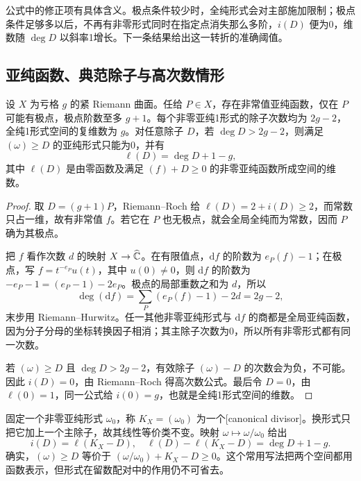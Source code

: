 公式中的修正项有具体含义。极点条件较少时，全纯形式会对主部施加限制；极点条件足够多以后，不再有非零形式同时在指定点消失那么多阶，\(i(D)\) 便为0，维数随 \(\deg D\) 以斜率1增长。下一条结果给出这一转折的准确阈值。

\subsection{亚纯函数、典范除子与高次数情形}
\label{b3:subsec:A0602}

\begin{proposition}[函数存在与典范次数]\label{b3:prop:A-riemann-roch-consequences}
设 \(X\) 为亏格 \(g\) 的紧 Riemann 曲面。任给 \(P\in X\)，存在非常值亚纯函数，仅在 \(P\) 可能有极点，极点阶数至多 \(g+1\)。每个非零亚纯1形式的除子次数均为 \(2g-2\)，全纯1形式空间的复维数为 \(g\)。对任意除子 \(D\)，若 \(\deg D>2g-2\)，则满足 \((\omega)\ge D\) 的亚纯形式只能为0，并有
\[
 \ell(D)=\deg D+1-g,
\]
其中 \(\ell(D)\) 是由零函数及满足 \((f)+D\ge0\) 的非零亚纯函数所成空间的维数。
\end{proposition}
\begin{proof}
取 \(D=(g+1)P\)，Riemann--Roch 给 \(\ell(D)=2+i(D)\ge2\)，而常数只占一维，故有非常值 \(f\)。若它在 \(P\) 也无极点，就会全局全纯而为常数，因而 \(P\) 确为其极点。

把 \(f\) 看作次数 \(d\) 的映射 \(X\rightarrow\widehat{\mathbb C\kern0pt}\)。在有限值点，\(\mathrm{d}f\) 的阶数为 \(e_P(f)-1\)；在极点，写 \(f=t^{-e_P}u(t)\)，其中 \(u(0)\ne0\)，则 \(\mathrm{d}f\) 的阶数为 \(-e_P-1=(e_P-1)-2e_P\)。极点的局部重数之和为 \(d\)，所以
\[
 \deg(\mathrm{d}f)=\sum_P(e_P(f)-1)-2d=2g-2,
\]
末步用 Riemann--Hurwitz。任一其他非零亚纯形式与 \(\mathrm{d}f\) 的商都是全局亚纯函数，因为分子分母的坐标转换因子相消；其主除子次数为0，所以所有非零形式都有同一次数。

若 \((\omega)\ge D\) 且 \(\deg D>2g-2\)，有效除子 \((\omega)-D\) 的次数会为负，不可能。因此 \(i(D)=0\)，由 Riemann--Roch 得高次数公式。最后令 \(D=0\)，由 \(\ell(0)=1\)，同一公式给 \(i(0)=g\)，也就是全纯1形式空间的维数。
\end{proof}

固定一个非零亚纯形式 \(\omega_0\)，称 \(K_X=(\omega_0)\) 为一个[canonical divisor]。换形式只把它加上一个主除子，故其线性等价类不变。映射 \(\omega\mapsto\omega/\omega_0\) 给出
\[
 i(D)=\ell(K_X-D),\quad
 \ell(D)-\ell(K_X-D)=\deg D+1-g.
\]
确实，\((\omega)\ge D\) 等价于 \((\omega/\omega_0)+K_X-D\ge0\)。这个常用写法把两个空间都用函数表示，但形式在留数配对中的作用仍不可省去。

